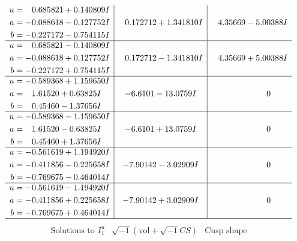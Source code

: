 \documentclass[1p]{elsarticle_modified}
\theoremstyle{definition}
\newcommand{\I}{\sqrt{-1}}
\begin{document}
$$\begin{array}{c|c|c}
\begin{aligned}
u &= \phantom{-}0.685821 + 0.140809 I \\
a &= -0.088618 - 0.127752 I \\
b &= -0.227172 - 0.754115 I\end{aligned}
 & \phantom{-}0.172712 + 1.341810 I & \phantom{-}4.35669 - 5.00388 I \\ \hline\begin{aligned}
u &= \phantom{-}0.685821 - 0.140809 I \\
a &= -0.088618 + 0.127752 I \\
b &= -0.227172 + 0.754115 I\end{aligned}
 & \phantom{-}0.172712 - 1.341810 I & \phantom{-}4.35669 + 5.00388 I \\ \hline\begin{aligned}
u &= -0.589368 + 1.159650 I \\
a &= \phantom{-}1.61520 + 0.63825 I \\
b &= \phantom{-}0.45460 - 1.37656 I\end{aligned}
 & -6.6101 - 13.0759 I & \phantom{-0.000000 } 0 \\ \hline\begin{aligned}
u &= -0.589368 - 1.159650 I \\
a &= \phantom{-}1.61520 - 0.63825 I \\
b &= \phantom{-}0.45460 + 1.37656 I\end{aligned}
 & -6.6101 + 13.0759 I & \phantom{-0.000000 } 0 \\ \hline\begin{aligned}
u &= -0.561619 + 1.194920 I \\
a &= -0.411856 - 0.225658 I \\
b &= -0.769675 - 0.464014 I\end{aligned}
 & -7.90142 - 3.02909 I & \phantom{-0.000000 } 0 \\ \hline\begin{aligned}
u &= -0.561619 - 1.194920 I \\
a &= -0.411856 + 0.225658 I \\
b &= -0.769675 + 0.464014 I\end{aligned}
 & -7.90142 + 3.02909 I & \phantom{-0.000000 } 0\\
 \hline 
 \end{array}$$\newpage$$\begin{array}{c|c|c}  
\text{Solutions to }I^u_{1}& \I (\text{vol} + \sqrt{-1}CS) & \text{Cusp shape}\\
 \hline 
\begin{aligned}

\end{aligned}
\end{array}$$
\end{document}
